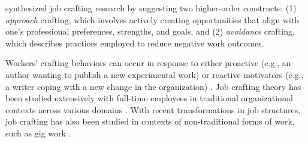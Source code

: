 \cite{zhang_2019} synthesized job crafting research by suggesting two higher-order constructs: (1) \textit{approach} crafting, which involves actively creating opportunities that align with one's professional preferences, strengths, and goals, and (2) \textit{avoidance} crafting, which describes practices employed to reduce negative work outcomes. 

Workers' crafting behaviors can occur in response to either proactive (e.g., an author wanting to publish a new experimental work) or reactive motivators (e.g., a writer coping with a new change in the organization) \cite{Lazazzara_2020}. 
Job crafting theory has been studied extensively with full-time employees in traditional organizational contexts across various domains \cite{Berg2010,Fuller2017}. 
With recent transformations in job structures, job crafting has also been studied in contexts of non-traditional forms of work, such as gig work \cite{Wong_Fieseler_2021}. 

